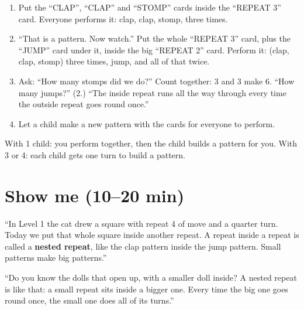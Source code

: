 \begin{unplugged}
\begin{enumerate}[leftmargin=1.4em,itemsep=1pt]
  \item Put the \enquote{CLAP}, \enquote{CLAP} and \enquote{STOMP} cards inside the \enquote{REPEAT 3} card. Everyone performs it: clap, clap, stomp, three times.
  \item \enquote{That is a pattern. Now watch.} Put the whole \enquote{REPEAT 3} card, plus the \enquote{JUMP} card under it, inside the big \enquote{REPEAT 2} card. Perform it: (clap, clap, stomp) three times, jump, and all of that twice.
  \item Ask: \enquote{How many stomps did we do?} Count together: 3 and 3 make 6. \enquote{How many jumps?} (2.) \enquote{The inside repeat runs all the way through every time the outside repeat goes round once.}
  \item Let a child make a new pattern with the cards for everyone to perform.
\end{enumerate}
With 1 child: you perform together, then the child builds a pattern for you. With 3 or 4: each child gets one turn to build a pattern.
\end{unplugged}

\section{Show me (10--20 min)}
\begin{teacherscript}
\enquote{In Level 1 the cat drew a square with repeat 4 of move and a quarter turn. Today we put that whole square inside another repeat. A repeat inside a repeat is called a \textbf{nested repeat}, like the clap pattern inside the jump pattern. Small patterns make big patterns.}
\end{teacherscript}

\begin{analogy}
\enquote{Do you know the dolls that open up, with a smaller doll inside? A nested repeat is like that: a small repeat sits inside a bigger one. Every time the big one goes round once, the small one does all of its turns.}
\end{analogy}

